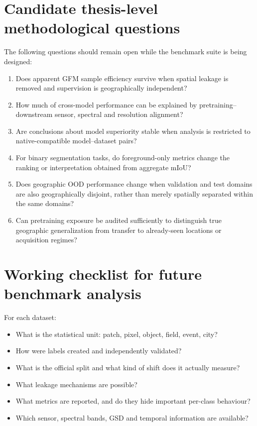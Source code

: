 \documentclass[11pt,a4paper]{article}
\begin{document}
\section{Candidate thesis-level methodological questions}

The following questions should remain open while the benchmark suite is being designed:

\begin{enumerate}
    \item Does apparent GFM sample efficiency survive when spatial leakage is removed and
    supervision is geographically independent?

    \item How much of cross-model performance can be explained by pretraining--downstream
    sensor, spectral and resolution alignment?

    \item Are conclusions about model superiority stable when analysis is restricted to
    native-compatible model--dataset pairs?

    \item For binary segmentation tasks, do foreground-only metrics change the ranking or
    interpretation obtained from aggregate mIoU?

    \item Does geographic OOD performance change when validation and test domains are also
    geographically disjoint, rather than merely spatially separated within the same domains?

    \item Can pretraining exposure be audited sufficiently to distinguish true geographic
    generalization from transfer to already-seen locations or acquisition regimes?
\end{enumerate}

\section{Working checklist for future benchmark analysis}

For each dataset:
\begin{itemize}
    \item What is the statistical unit: patch, pixel, object, field, event, city?
    \item How were labels created and independently validated?
    \item What is the official split and what kind of shift does it actually measure?
    \item What leakage mechanisms are possible?
    \item What metrics are reported, and do they hide important per-class behaviour?
    \item Which sensor, spectral bands, GSD and temporal information are available?
\end{itemize}
\end{document}
